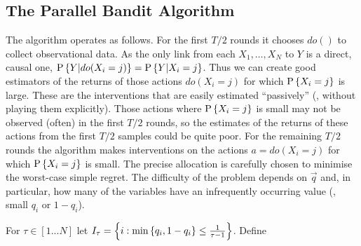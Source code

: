 


\subsection{The Parallel Bandit Algorithm}
\label{sub:par-bandit-alg}

The algorithm operates as follows. For the first $T/2$ rounds it chooses $do()$ to collect observational data. As the only link from each $X_1,\ldots,X_N$ to $Y$ is a direct, causal one, $\P{Y|do(X_i=j)}=\P{Y|X_i=j}$. Thus we can create good estimators of the returns of those actions $do(X_i = j)$ for which $\P{X_i = j}$ is large. 
These are the interventions that are easily estimated ``passively'' (\ie, without playing them explicitly). 
Those actions where $\P{X_i = j}$ is small may not be observed (often) in the first $T/2$ rounds, so
the estimates of the returns of these actions from the first $T/2$ samples could be quite poor. For the remaining $T/2$ rounds
the algorithm makes interventions on the actions $a = do(X_i = j)$ for which $\P{X_i = j}$ is small. The precise allocation is
carefully chosen to minimise the worst-case simple regret. 
The difficulty of the problem depends on $\vec{q}$ and, in particular, how many of the variables have an infrequently occurring value (\ie, small $q_i$ or $1-q_i$). 

For $\tau \in [1...N]$ let $I_\tau = \set{ i : \min\set{q_i, 1-q_i} \leq \frac{1}{\tau - 1}}$.
Define

